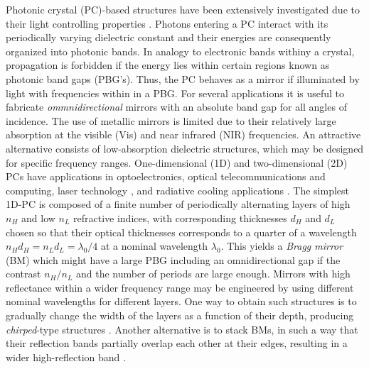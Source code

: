 \documentclass[a4paper,fleqn]{cas-sc}
\begin{document}
Photonic crystal (PC)-based structures have been extensively investigated due
to their light controlling properties \cite{Joannopoulos2008,Goyal2018}.
Photons entering a PC interact with its periodically varying dielectric constant and
their energies are consequently organized into photonic bands. In
analogy to electronic bands withiny a
crystal, propagation is forbidden if the energy lies
within certain regions known as photonic band gaps (PBG's). Thus, the
PC behaves as a mirror if illuminated by light with frequencies
within in a PBG. For several applications it is useful to fabricate
{\em ommnidirectional} mirrors with an absolute band gap for all angles of incidence.
The use of metallic
mirrors is limited due to their relatively large absorption at the
visible (Vis) and near infrared (NIR) frequencies.  An attractive alternative
consists of low-absorption dielectric
structures,  which may be designed for specific frequency
ranges. One-dimensional (1D) and two-dimensional (2D) PCs have
applications in optoelectronics, optical telecommunications and computing,
laser technology \cite{Lopez2003,Masaya2010}, and radiative cooling applications
\cite{Kumar2020}. The simplest 1D-PC is composed of a finite number
of periodically alternating
layers of high $n_{H}$ and low $n_{L}$ refractive indices, with
corresponding thicknesses $d_H$ and $d_L$ chosen so that their optical
thicknesses corresponds to a quarter of a wavelength
$n_{H}d_{H}=n_{L}d_{L}=\lambda_{0}/4$ at a nominal
wavelength $\lambda_{0}$. This yields a {\em Bragg mirror} (BM)
which might have a large PBG including an omnidirectional gap if the contrast $n_H/n_L$
and the number of periods are large enough. Mirrors with high
reflectance within a wider frequency range may be engineered by
using different nominal wavelengths for different layers.
One way to obtain such structures is to gradually change the width of
the layers as a function of their depth, producing
\textit{chirped}-type structures \cite{Zipock1997}.
Another alternative is to stack BMs, in such a way that their reflection bands partially
overlap each other at their edges, resulting in a wider high-reflection band \cite{Xifre2009}.
\end{document}
